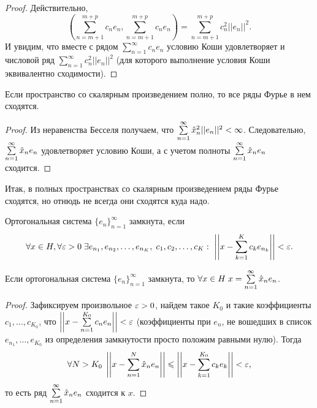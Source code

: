 \begin{proof}

Действительно,
$$
\left(\sum\limits_{n=m+1}^{m+p}c_ne_n, \sum\limits_{n=m+1}^{m+p}c_ne_n\right) =  \sum\limits_{n=m+1}^{m+p}c_n^2 ||e_n||^2.
$$
И увидим, что вместе с рядом $\sum\limits_{n=1}^{\infty} c_n e_n$  условию Коши удовлетворяет и числовой ряд $\sum\limits_{n=1}^{\infty}c_n^2||e_n||^2$ (для которого выполнение условия Коши эквивалентно сходимости).
\end{proof}
\begin{Consequence}
    Если пространство со скалярным произведением полно, то все ряды Фурье в нем сходятся.
\end{Consequence}
\begin{proof}
    Из неравенства Бесселя получаем, что
    $\sum\limits_{n=1}^{\infty} \hat{x}_n^2 ||e_n||^2 < \infty$. Следовательно, $ \sum\limits_{n=1}^{\infty} \hat{x}_ne_n 
    $ удовлетворяет условию Коши, а с учетом полноты $\sum\limits_{n=1}^{\infty}\hat{x}_n e_n$ сходится.
\end{proof}
Итак, в полных пространствах со скалярным произведением ряды Фурье сходятся, но отнюдь не всегда они сходятся куда надо.
\begin{Def}
    Ортогональная система $\{e_n\}_{n=1}^{\infty}$ замкнута, если 
    $$\forall x\in H, \forall \varepsilon >0\; \exists e_{n_1}, e_{n_2}, \ldots, e_{n_K},\; c_1, c_2, \ldots, c_K:\ \left|\left|x - \sum\limits_{k=1}^{K} c_k e_{n_k}\right|\right|<\varepsilon.
    $$
\end{Def}

\begin{Statement}
    Если ортогональная система $\{e_n\}_{n=1}^{\infty}$ замкнута, то $\forall x\in H\; x = \sum\limits_{n=1}^{\infty}\hat{x}_n e_{n}$.
\end{Statement}
\begin{proof}
    Зафиксируем произвольное $\varepsilon >0$, найдем такое $K_0$ и такие коэффициенты $c_1, \ldots, c_{K_0}$, что $\left|\left| x - \sum\limits_{n=1}^{K_0} c_ne_n \right|\right| < \varepsilon$ (коэффициенты при $e_n$, не вошедших в список $ e_{n_1}, \ldots, e_{K_0}$ из определения замкнутости просто положим равными нулю). Тогда
    $$
        \forall N>K_0 \; \left|\left|x - \sum\limits_{n=1}^{N}\hat{x}_ne_n\right|\right|\leqslant \left|\left|x - \sum\limits_{k=1}^{K_0}c_ke_k \right|\right| < \varepsilon,
    $$
    то есть ряд $\sum\limits_{n=1}^{\infty}\hat{x}_ne_n$ сходится к $x$.
\end{proof}
